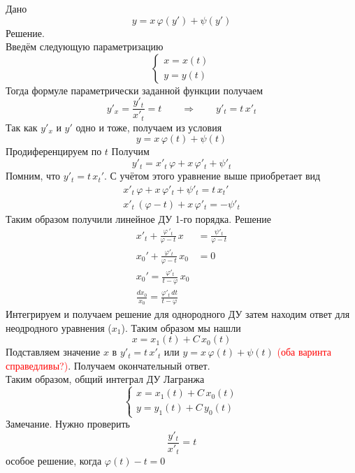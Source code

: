 \begin{Note}
    Дано
    \[
        y=x\,\varphi(y')+\psi(y')
    \]
    Решение.\\
    Введём следующую параметризацию
    \[
        \begin{cases}
            x = x(t)\\
            y = y(t)
        \end{cases}
    \]
    Тогда формуле параметрически заданной функции получаем
    \[
        y'_x=\frac{y'_t}{x'_t}=t \qquad \Rightarrow \qquad y'_t=t\,x'_t
    \]
    Так как $y'_x$ и $y'$ одно и тоже, получаем из условия
    \[
        y = x\,\varphi(t) + \psi(t)
    \]
    Продиференцируем по $t$ Получим
    \[
        y'_t = x'_t\,\varphi + x\,\varphi'_t + \psi'_t
    \]
    Помним, что $y'_t = t \, x_t'$. С учётом этого уравнение выше приобретает вид
    \begin{align*}
        x'_t\,\varphi + x\,\varphi'_t + \psi'_t = t \, x_t'\\
        x'_t\,(\varphi - t) + x\,\varphi'_t = -\psi'_t
    \end{align*}
    Таким образом получили линейное ДУ 1-го порядка. Решение
    \begin{align*}
        x'_t + \frac{\varphi\,'_t}{\varphi-t}\,x &= \frac{\psi'_t}{\varphi-t}\\
        x_0' + \frac{\varphi'_t}{\varphi-t}\,x_0 &= 0\\
        x_0' = \frac{\varphi'_t}{t - \varphi}\,x_0\\
        \frac{dx_0}{x_0} = \frac{\varphi'_t\, dt}{t - \varphi}
    \end{align*}
    Интегрируем и получаем решение для однородного ДУ затем находим ответ для неодродного уравнения ($x_1$). Таким образом мы нашли 
    \[
        x=x_1(t)+C\,x_0(t)
    \]
    Подставляем значение $x$ в $y'_t=t\,x'_t$ или $y = x\,\varphi(t) + \psi(t)$ \textcolor{red}{(оба варинта справедливы?)}. Получаем окончательный ответ.\\
    Таким образом, общий интеграл ДУ Лагранжа
    \[
        \begin{cases}
            x=x_1(t)+C\,x_0(t)\\
            y=y_1(t)+C\,y_0(t)
        \end{cases}
    \]
    Замечание. Нужно проверить\\
    \[
        \frac{y'_t}{x'_t}=t
    \]
    особое решение, когда $\varphi(t)-t=0$\\
\end{Note}



